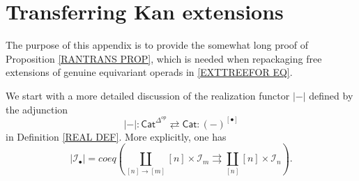 \documentclass[a4paper,10pt
,draft
]{article}%
\numberwithin{equation}{section}
\numberwithin{figure}{section}
\theoremstyle{definition} %
\newcommand{\set}[1]{\left\{#1\right\}}%
\newcommand{\into}{\hookrightarrow}%
\newcommand{\V}{\ensuremath{\mathcal V}}
\newcommand{\1}{\ensuremath{\mathbbm 1}}%
\begin{document}

















\appendix


\section{Transferring Kan extensions}
\label{TRANSKAN AP}

The purpose of this appendix is to provide the
somewhat long proof of Proposition \ref{RANTRANS PROP}, 
which is needed when repackaging free extensions of
genuine equivariant operads in \eqref{EXTTREEFOR EQ}.


We start with a more detailed discussion of the realization functor $|\minus|$
defined by the adjunction
	\[
	|\minus|\colon
	\mathsf{Cat}^{\Delta^{op}} 
		\rightleftarrows
	\mathsf{Cat} 
	\colon (\minus)^{[\bullet]}
	\]
in Definition \ref{REAL DEF}.
More explicitly, one has
\begin{equation}\label{REALDEF EQ}
	 |\mathcal{I}_{\bullet}| =
	coeq \left(\coprod_{[n] \to [m]}
	 [n] \times \mathcal{I}_m
	 	\rightrightarrows
	 \coprod_{[n]} [n] \times \mathcal{I}_n
	 \right).
\end{equation}
\end{document}
